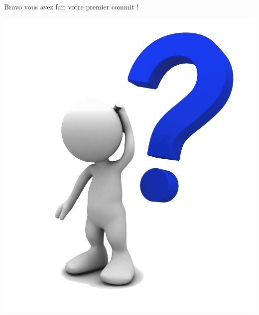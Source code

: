 \documentclass[usenames,dvipsnames]{beamer}
\begin{document}
\begin{frame}
	Bravo vous avez fait votre premier commit !
	\pause
	\begin{center}
		\includegraphics[width=0.5\linewidth]{Im/question-mark.png}
	\end{center}
\end{frame}


	
	
	

	

	
\end{document}
